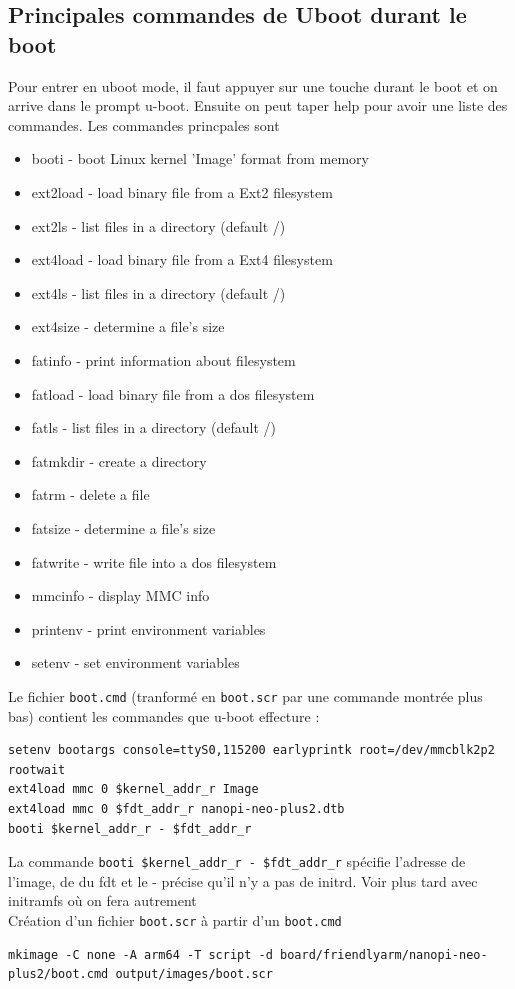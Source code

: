 \subsection{Principales commandes de Uboot durant le boot}
Pour entrer en uboot mode, il faut appuyer sur une touche durant le boot et on arrive dans le prompt u-boot. Ensuite on peut taper help pour avoir une liste des commandes. Les commandes princpales sont
\begin{itemize}
\item booti - boot Linux kernel 'Image' format from memory
\item ext2load  - load binary file from a Ext2 filesystem
\item ext2ls    - list files in a directory (default /)
\item ext4load  - load binary file from a Ext4 filesystem
\item ext4ls    - list files in a directory (default /)
\item ext4size  - determine a file's size
\item fatinfo   - print information about filesystem
\item fatload   - load binary file from a dos filesystem
\item fatls     - list files in a directory (default /)
\item fatmkdir  - create a directory
\item fatrm     - delete a file
\item fatsize   - determine a file's size
\item fatwrite  - write file into a dos filesystem
\item mmcinfo   - display MMC info
\item printenv  - print environment variables
\item setenv    - set environment variables
\end{itemize}
Le fichier \verb!boot.cmd! (tranformé en \verb!boot.scr! par une commande montrée plus bas) contient les commandes que u-boot effecture : 
\begin{lstlisting}[style=bash]
setenv bootargs console=ttyS0,115200 earlyprintk root=/dev/mmcblk2p2 rootwait
ext4load mmc 0 $kernel_addr_r Image
ext4load mmc 0 $fdt_addr_r nanopi-neo-plus2.dtb
booti $kernel_addr_r - $fdt_addr_r
\end{lstlisting}
La commande \verb!booti $kernel_addr_r - $fdt_addr_r! spécifie l'adresse de l'image, de du fdt et le - précise qu'il n'y a pas de initrd. Voir plus tard avec initramfs où on fera autrement\\
Création d'un fichier \verb!boot.scr! à partir d'un  \verb!boot.cmd!
\begin{lstlisting}[style=bash]
mkimage -C none -A arm64 -T script -d board/friendlyarm/nanopi-neo-plus2/boot.cmd output/images/boot.scr

\end{lstlisting}
